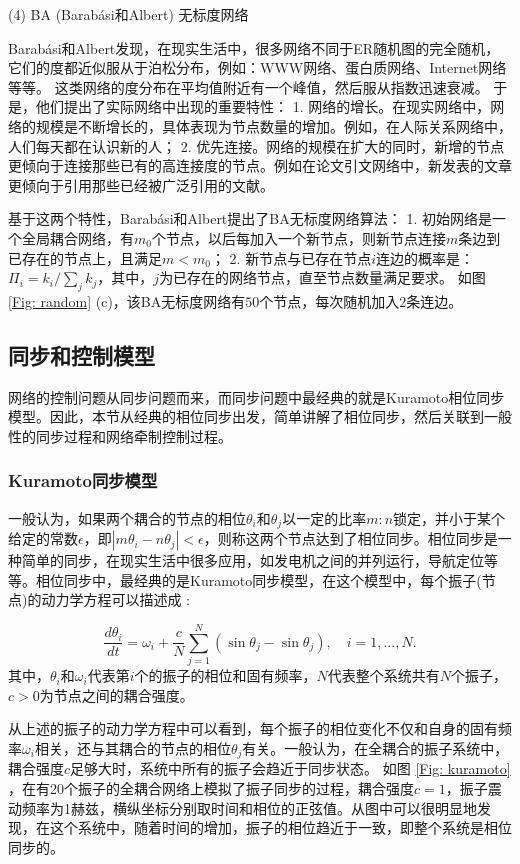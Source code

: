 (4) BA (Barab\'{a}si和Albert) 无标度网络 \cite{Durrett2007}

Barab\'{a}si和Albert发现，在现实生活中，很多网络不同于ER随机图的完全随机，它们的度都近似服从于泊松分布，例如：WWW网络、蛋白质网络、Internet网络等等。
这类网络的度分布在平均值附近有一个峰值，然后服从指数迅速衰减。
于是，他们提出了实际网络中出现的重要特性：
1. 网络的增长。在现实网络中，网络的规模是不断增长的，具体表现为节点数量的增加。例如，在人际关系网络中，人们每天都在认识新的人；
2. 优先连接。网络的规模在扩大的同时，新增的节点更倾向于连接那些已有的高连接度的节点。例如在论文引文网络中，新发表的文章更倾向于引用那些已经被广泛引用的文献。

基于这两个特性，Barab\'{a}si和Albert提出了BA无标度网络算法：
1. 初始网络是一个全局耦合网络，有$ m_0 $个节点，以后每加入一个新节点，则新节点连接$ m $条边到已存在的节点上，且满足$ m<m_0 $；
2. 新节点与已存在节点$ i $连边的概率是：$ \Pi_i={k_i}/ {\sum_{j}{k_j}} $，其中，$ j $为已存在的网络节点，直至节点数量满足要求。
如图\ref{Fig: random} (c)，该BA无标度网络有$ 50 $个节点，每次随机加入$ 2 $条连边。

\subsection{同步和控制模型}
网络的控制问题从同步问题而来，而同步问题中最经典的就是Kuramoto相位同步模型。因此，本节从经典的相位同步出发，简单讲解了相位同步，然后关联到一般性的同步过程和网络牵制控制过程。

\subsubsection{Kuramoto同步模型}
一般认为，如果两个耦合的节点的相位$ \theta_i $和$ \theta_j $以一定的比率$ m:n $锁定，并小于某个给定的常数$ \epsilon $，即$ |m\theta_i-n\theta_j|<\epsilon $，则称这两个节点达到了相位同步。相位同步是一种简单的同步，在现实生活中很多应用，如发电机之间的并列运行，导航定位等等。相位同步中，最经典的是Kuramoto同步模型，在这个模型中，每个振子(节点)的动力学方程可以描述成 \cite{Rodrigues2016}:

\begin{equation}
\frac{d\theta_i}{dt}=\omega_i+\frac{c}{N}\sum_{j=1}^{N}(\sin \theta_j-\sin \theta_j), \quad i=1,...,N.
\end{equation}
其中，$ \theta_i $和$ \omega_i $代表第$ i $个的振子的相位和固有频率，$ N $代表整个系统共有$ N $个振子，$ c>0 $为节点之间的耦合强度。


从上述的振子的动力学方程中可以看到，每个振子的相位变化不仅和自身的固有频率$ \omega_i $相关，还与其耦合的节点的相位$ \theta_j $有关。一般认为，在全耦合的振子系统中，耦合强度$ c $足够大时，系统中所有的振子会趋近于同步状态。
如图 \ref{Fig: kuramoto} ，在有20个振子的全耦合网络上模拟了振子同步的过程，耦合强度$ c=1 $，振子震动频率为1赫兹，横纵坐标分别取时间和相位的正弦值。从图中可以很明显地发现，在这个系统中，随着时间的增加，振子的相位趋近于一致，即整个系统是相位同步的。

